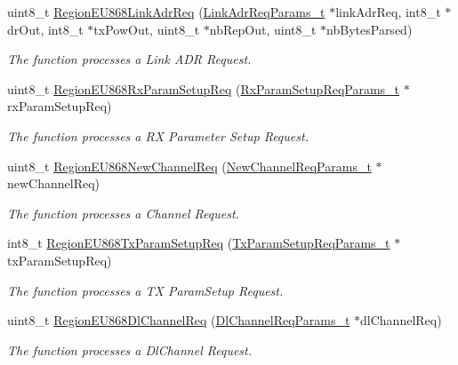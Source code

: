 \begin{DoxyCompactItemize}
uint8\+\_\+t \hyperlink{group__REGIONEU868_gace7b25487170fb5d862413fc221f95db}{Region\+E\+U868\+Link\+Adr\+Req} (\hyperlink{group__REGION_gad4af503e8d4de1846129e26a799a1e8e}{Link\+Adr\+Req\+Params\+\_\+t} $\ast$link\+Adr\+Req, int8\+\_\+t $\ast$dr\+Out, int8\+\_\+t $\ast$tx\+Pow\+Out, uint8\+\_\+t $\ast$nb\+Rep\+Out, uint8\+\_\+t $\ast$nb\+Bytes\+Parsed)
\begin{DoxyCompactList}\small\item\em The function processes a Link A\+DR Request. \end{DoxyCompactList}\item 
uint8\+\_\+t \hyperlink{group__REGIONEU868_gaa175de2c9f3882ef0b89120db3d8882d}{Region\+E\+U868\+Rx\+Param\+Setup\+Req} (\hyperlink{group__REGION_ga7165f282c670c728c36d534df2285157}{Rx\+Param\+Setup\+Req\+Params\+\_\+t} $\ast$rx\+Param\+Setup\+Req)
\begin{DoxyCompactList}\small\item\em The function processes a RX Parameter Setup Request. \end{DoxyCompactList}\item 
uint8\+\_\+t \hyperlink{group__REGIONEU868_ga4325b111d5f14ddc4b33f5e827a8986e}{Region\+E\+U868\+New\+Channel\+Req} (\hyperlink{group__REGION_gae2abcdb6dbb843c9faf5fd3009eca9d6}{New\+Channel\+Req\+Params\+\_\+t} $\ast$new\+Channel\+Req)
\begin{DoxyCompactList}\small\item\em The function processes a Channel Request. \end{DoxyCompactList}\item 
int8\+\_\+t \hyperlink{group__REGIONEU868_ga7f1768fb828bb81f3f6faec0dc734d29}{Region\+E\+U868\+Tx\+Param\+Setup\+Req} (\hyperlink{group__REGION_ga26836ef2996e70410e42ef471073f855}{Tx\+Param\+Setup\+Req\+Params\+\_\+t} $\ast$tx\+Param\+Setup\+Req)
\begin{DoxyCompactList}\small\item\em The function processes a TX Param\+Setup Request. \end{DoxyCompactList}\item 
uint8\+\_\+t \hyperlink{group__REGIONEU868_ga61ddb6ba84f203ba1c7ab3b19e2322aa}{Region\+E\+U868\+Dl\+Channel\+Req} (\hyperlink{group__REGION_gae0d608ff1f8ea0a430e4f9a4c38ec7f3}{Dl\+Channel\+Req\+Params\+\_\+t} $\ast$dl\+Channel\+Req)
\begin{DoxyCompactList}\small\item\em The function processes a Dl\+Channel Request. \end{DoxyCompactList}\item 

\end{DoxyCompactItemize}

